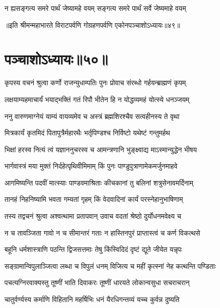 \twolineshloka
{न ह्यसङ्गत्य समरे पार्थं जेष्यामहे वयम्}
{सङ्गत्य समरे पार्थं सर्वे जेष्यमाहे वयम्}

॥इति श्रीमन्महाभारते विराटपर्वणि गोग्रहणपर्वणि एकोनपञ्चाशोऽध्यायः॥४९॥

\chapter{पञ्चाशोऽध्यायः॥५०॥}

\twolineshloka
{कृपस्य वचनं श्रुत्वा कर्णो राजन्युधाम्पतिः}
{पुनः प्रोवाच संरब्धो गर्हयन्ब्राह्मणं कृपम्}




\twolineshloka
{लक्षयाम्यहमाचार्यं भयाद्भक्तिं गतं रिपौ}
{भीतेन हि न योद्धव्यमहं योत्स्ये धनञ्जयम्}


\twolineshloka
{ननु वारुणमाग्नेयं याम्यं वायव्यमेव च}
{अस्त्रं ब्रह्मशिरश्चैव सत्वहीनस्य ते वृथा}


\twolineshloka
{मित्रकार्यं कृतमिदं पितापुत्रैर्महारथैः}
{भर्तृपिण्डश्च निर्विष्टो यथेष्टं गन्तुमर्हथ}


\twolineshloka
{भिक्षां हरस्व नित्यं त्वं यज्ञाननुचरस्व च}
{आमन्त्रणानि भुङ्क्ष्वाद्य माऽस्मान्युद्धेन भीषय}


\twolineshloka
{भार्गवास्त्रं मया मुक्तं निर्दहेत्पृथिवीमिमाम्}
{किं पुनः पाण्डुपुत्राणामेकमर्जुनमाहवे}


\twolineshloka
{आगमिष्यन्ति पदवीं मात्स्याः पाण्डवमाश्रिताः}
{कीचकानां तु बलिनां शत्रुसेनावमर्दिनाम्}


\twolineshloka
{तानहं निहनिष्यामि भवता गम्यतां गृहम्}
{किं वेदवादिनां कार्यं परस्नेहानुभाषिणाम्}


\twolineshloka
{तस्य तद्वचनं श्रुत्वा अश्वत्थामा प्रतापवान्}
{उवाच वदतां श्रेष्ठो दुर्योधनमवेक्ष्य च}


\twolineshloka
{न च तावञ्जिता गावो न च सीमान्तरं गताः}
{न हास्तिनपुरं प्राप्तास्त्वं च कर्ण विकत्थसे}


\twolineshloka
{बहूनि धर्मशास्त्राणि पठन्ति द्विजसत्तमाः}
{तेषु किंस्विदिदं दृष्टं द्यूते जीयेत यन्नृपः}


\twolineshloka
{सङ्ग्रामान्विपुलाञ्जित्वा लब्धा च विपुलं धनम्}
{विजित्य च महीं कृत्स्नां नेह कत्थन्ति पण्डिताः}


\twolineshloka
{पचत्यग्निरवाक्यस्तु तूष्णीं भाति दिवाकरः}
{तूष्णीं धारयते लोकान्वसुधा सचराचरान्}


\twolineshloka
{चातुर्वर्ण्यस्य कर्माणि विहितानि महर्षिभिः}
{धनं यैरधिगन्तव्यं यच्च कुर्वन्न दुष्यति}


